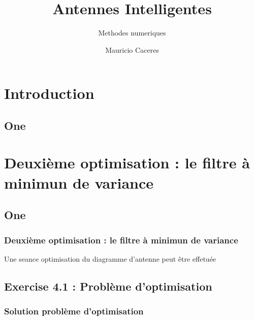 \documentclass[11pt]{beamer}
\begin{document}
	\author{Mauricio Caceres}
	\title{Antennes Intelligentes}
	\subtitle{Methodes numeriques}
	\logo{}
	\institute{}
	\date{}
	\subject{}
	\frame[plain]{\maketitle}
%
%
	\section{Introduction}
	\begin{frame}
	\subsection{One}
		\frametitle{}
	\end{frame}
%
%
	\section{Deuxième optimisation : le filtre à minimun de variance}
	\begin{frame}
		\subsection{One}
		\frametitle{Deuxième optimisation : le filtre à minimun de variance}
		Une seance optimisation du diagramme d'antenne peut être effetuée
	\end{frame}
\subsection{Exercise 4.1 : Problème d'optimisation}
\begin{frame}

	\frametitle{Solution problème d'optimisation}
\end{frame}
\end{document}
